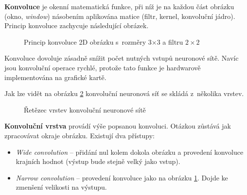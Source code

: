 \textbf{Konvoluce} je okenní matematická funkce, při níž je na každou část obrázku (okno, \emph{window}) násobením aplikována matice (filtr, kernel, konvoluční jádro). Princip konvoluce zachycuje následující obrázek.

\begin{figure}[H]
  \begin{center}
  \label{obrazek:principkonvoluce}
  \caption{Princip konvoluce 2D obrázku s~rozměry 3$\times$3 a filtru $2\times2$}
  \end{center}
\end{figure}

Konvoluce dovoluje zásadně snížit počet nutných vstupů neuronové sítě. Navíc jsou konvoluční operace rychlé, protože tato funkce je hardwarově implementována na grafické kartě.

Jak lze vidět na obrázku \ref{obrazek:cnnpipeline} konvoluční neuronová síť se skládá z~několika vrstev.

\begin{figure}[H]
  \begin{center}
  \label{obrazek:cnnpipeline}
  \caption{Řetězec vrstev konvoluční neuronové sítě \cite{cnnNlp}}
  \end{center}
\end{figure}

\textbf{Konvoluční vrstva} provádí výše popsanou konvoluci. Otázkou zůstává jak zpracovávat okraje obrázku. Existují dva přístupy:

\begin{itemize}
  \item \emph{Wide convolution} -- přidání nul kolem dokola obrázku a provedení konvoluce krajních hodnot (výstup bude stejně velký jako vstup).
  \item \emph{Narrow convolution} -- provedení konvoluce jako na obrázku \ref{obrazek:principkonvoluce}. Dojde ke zmenšení velikosti na výstupu.
\end{itemize}

